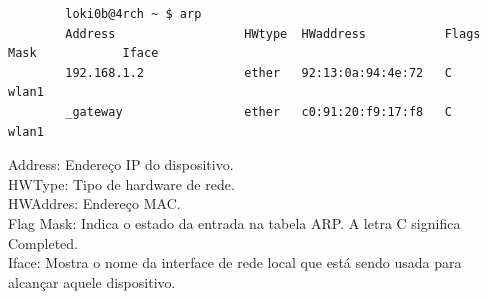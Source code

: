 \begin{solution}
    \begin{verbatim}
        loki0b@4rch ~ $ arp
        Address                  HWtype  HWaddress           Flags Mask            Iface
        192.168.1.2              ether   92:13:0a:94:4e:72   C                     wlan1
        _gateway                 ether   c0:91:20:f9:17:f8   C                     wlan1
    \end{verbatim}

    Address: Endereço IP do dispositivo.\\
    HWType: Tipo de hardware de rede.\\
    HWAddres: Endereço MAC.\\
    Flag Mask: Indica o estado da entrada na tabela ARP. A letra C significa Completed.\\
    Iface: Mostra o nome da interface de rede local que está sendo usada para alcançar aquele dispositivo.\\
\end{solution}